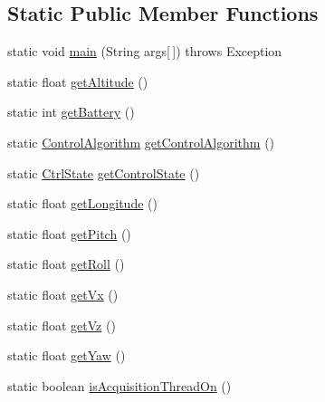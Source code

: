 \subsection*{Static Public Member Functions}
\begin{DoxyCompactItemize}
\item 
static void \hyperlink{classworkspace_1_1_a_r_drone_nav_data_1_1src_1_1_nav_data_ace3cd1e72bda115d0109f6f89a1e9c36}{main} (String args\mbox{[}$\,$\mbox{]})  throws Exception 
\item 
static float \hyperlink{classworkspace_1_1_a_r_drone_nav_data_1_1src_1_1_nav_data_a79eab60c13c9c2f6728267a1013ae764}{get\+Altitude} ()
\item 
static int \hyperlink{classworkspace_1_1_a_r_drone_nav_data_1_1src_1_1_nav_data_a7bbbd6d250fe71409288009c161823b1}{get\+Battery} ()
\item 
static \hyperlink{enumworkspace_1_1_a_r_drone_nav_data_1_1src_1_1controller_1_1_control_algorithm}{Control\+Algorithm} \hyperlink{classworkspace_1_1_a_r_drone_nav_data_1_1src_1_1_nav_data_aefcbd8c779172ae61ae15e3cb768c877}{get\+Control\+Algorithm} ()
\item 
static \hyperlink{enumworkspace_1_1_a_r_drone_nav_data_1_1src_1_1controller_1_1_ctrl_state}{Ctrl\+State} \hyperlink{classworkspace_1_1_a_r_drone_nav_data_1_1src_1_1_nav_data_ad0abc9f7663edd591512b744aa730788}{get\+Control\+State} ()
\item 
static float \hyperlink{classworkspace_1_1_a_r_drone_nav_data_1_1src_1_1_nav_data_a60a8275d48d48979c7c6831f97c32515}{get\+Longitude} ()
\item 
static float \hyperlink{classworkspace_1_1_a_r_drone_nav_data_1_1src_1_1_nav_data_a4be94e5d0a3e4a6a16c6e9d9c91dfc39}{get\+Pitch} ()
\item 
static float \hyperlink{classworkspace_1_1_a_r_drone_nav_data_1_1src_1_1_nav_data_a81a1003619801deff5d20adf4c5eff1b}{get\+Roll} ()
\item 
static float \hyperlink{classworkspace_1_1_a_r_drone_nav_data_1_1src_1_1_nav_data_a275ef3b4f627588bd0a192d9c45a8e3f}{get\+Vx} ()
\item 
static float \hyperlink{classworkspace_1_1_a_r_drone_nav_data_1_1src_1_1_nav_data_a1e19da162884788ecca135fa6862acd4}{get\+Vz} ()
\item 
static float \hyperlink{classworkspace_1_1_a_r_drone_nav_data_1_1src_1_1_nav_data_a6e49f2b4b2fd5defacbcfb941e5fa056}{get\+Yaw} ()
\item 
static boolean \hyperlink{classworkspace_1_1_a_r_drone_nav_data_1_1src_1_1_nav_data_ace0693506320a19f6bfa2e2d4880bf5d}{is\+Acquisition\+Thread\+On} ()

\end{DoxyCompactItemize}
